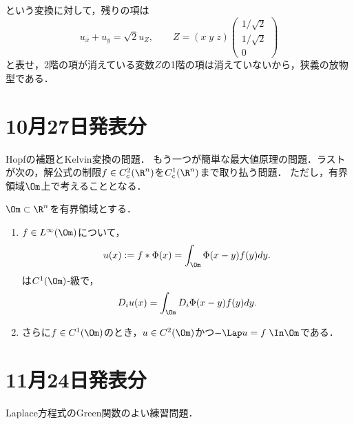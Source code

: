 \documentclass[uplatex,dvipdfmx]{jsarticle}
\begin{document}
\begin{Proof}
\begin{enumerate}
        という変換に対して，残りの項は
        \[u_x+u_y=\sqrt{2}u_Z,\qquad Z=(x\;y\;z)\begin{pmatrix}1/\sqrt{2}\\1/\sqrt{2}\\0\end{pmatrix}\]
        と表せ，2階の項が消えている変数$Z$の1階の項は消えていないから，狭義の放物型である．
    \end{enumerate}
\end{Proof}

\section{10月27日発表分}

Hopfの補題とKelvin変換の問題．
もう一つが簡単な最大値原理の問題．ラストが次の，解公式の制限$f\in C_c^2(\R^n)$を$C^1_c(\R^n)$まで取り払う問題．
ただし，有界領域$\Om$上で考えることとなる．

\begin{problem}
    $\Om\subset\R^n$を有界領域とする．
    \begin{enumerate}
        \item $f\in L^\infty(\Om)$について，
        \[u(x):=f*\Phi(x)=\int_\Om\Phi(x-y)f(y)dy.\]
        は$C^1(\Om)$-級で，
        \[D_iu(x)=\int_\Om D_i\Phi(x-y)f(y)dy.\]
        \item さらに$f\in C^1(\Om)$のとき，$u\in C^2(\Om)$かつ$-\Lap u=f\;\In\Om$である．
    \end{enumerate}
\end{problem}

\section{11月24日発表分}

\begin{tcolorbox}[colframe=ForestGreen, colback=ForestGreen!10!white,breakable,colbacktitle=ForestGreen!40!white,coltitle=black,fonttitle=\bfseries\sffamily,
title=]
    Laplace方程式のGreen関数のよい練習問題．
\end{tcolorbox}
\end{document}

